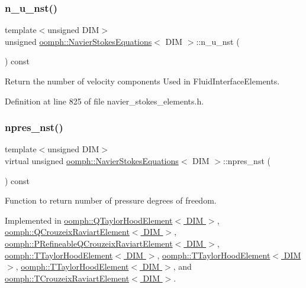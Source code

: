 \subsubsection{\texorpdfstring{n\+\_\+u\+\_\+nst()}{n\_u\_nst()}}
{\footnotesize\ttfamily template$<$unsigned D\+IM$>$ \\
unsigned \hyperlink{classoomph_1_1NavierStokesEquations}{oomph\+::\+Navier\+Stokes\+Equations}$<$ D\+IM $>$\+::n\+\_\+u\+\_\+nst (\begin{DoxyParamCaption}{ }\end{DoxyParamCaption}) const\hspace{0.3cm}{\ttfamily [inline]}}



Return the number of velocity components Used in Fluid\+Interface\+Elements. 



Definition at line 825 of file navier\+\_\+stokes\+\_\+elements.\+h.

\mbox{\label{classoomph_1_1NavierStokesEquations_a4a17a76873bf3131d1e0acc74fb1c2d8}} 
\subsubsection{\texorpdfstring{npres\+\_\+nst()}{npres\_nst()}}
{\footnotesize\ttfamily template$<$unsigned D\+IM$>$ \\
virtual unsigned \hyperlink{classoomph_1_1NavierStokesEquations}{oomph\+::\+Navier\+Stokes\+Equations}$<$ D\+IM $>$\+::npres\+\_\+nst (\begin{DoxyParamCaption}{ }\end{DoxyParamCaption}) const\hspace{0.3cm}{\ttfamily [pure virtual]}}



Function to return number of pressure degrees of freedom. 



Implemented in \hyperlink{classoomph_1_1QTaylorHoodElement_aaf60ebf583d9671f7adddca94e6029ac}{oomph\+::\+Q\+Taylor\+Hood\+Element$<$ D\+I\+M $>$}, \hyperlink{classoomph_1_1QCrouzeixRaviartElement_a0cbd8f1a5e0814abdbfd34ae7c58b018}{oomph\+::\+Q\+Crouzeix\+Raviart\+Element$<$ D\+I\+M $>$}, \hyperlink{classoomph_1_1PRefineableQCrouzeixRaviartElement_a6431bb5f74022a94d074d04ba2f4c7a1}{oomph\+::\+P\+Refineable\+Q\+Crouzeix\+Raviart\+Element$<$ D\+I\+M $>$}, \hyperlink{classoomph_1_1TTaylorHoodElement_a48bd219a6eb03eccd3c375b61204df36}{oomph\+::\+T\+Taylor\+Hood\+Element$<$ D\+I\+M $>$}, \hyperlink{classoomph_1_1TTaylorHoodElement_a2e07d9fa250ad11396677a14f6d21a4a}{oomph\+::\+T\+Taylor\+Hood\+Element$<$ D\+I\+M $>$}, \hyperlink{classoomph_1_1TTaylorHoodElement_ae8b8462176202ddc647cd59c731d9eb9}{oomph\+::\+T\+Taylor\+Hood\+Element$<$ D\+I\+M $>$}, and \hyperlink{classoomph_1_1TCrouzeixRaviartElement_a289602f8b25e2b538ac4cbe0cc5c22d0}{oomph\+::\+T\+Crouzeix\+Raviart\+Element$<$ D\+I\+M $>$}.

